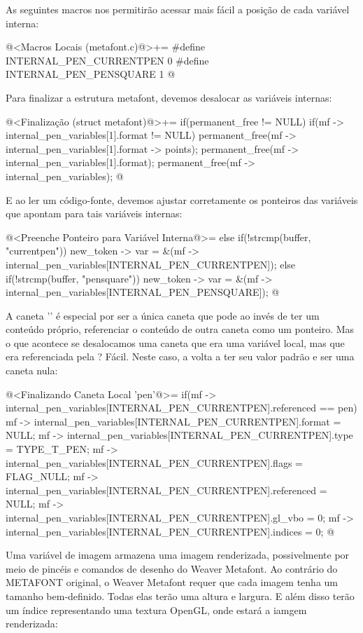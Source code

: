 As seguintes macros nos permitirão acessar mais fácil a posição de
cada variável interna:

\iniciocodigo
@<Macros Locais (metafont.c)@>+=
#define INTERNAL_PEN_CURRENTPEN 0
#define INTERNAL_PEN_PENSQUARE  1
@
\fimcodigo

Para finalizar a estrutura metafont, devemos desalocar as variáveis
internas:

\iniciocodigo
@<Finalização (struct metafont)@>+=
if(permanent_free != NULL){
  if(mf -> internal_pen_variables[1].format != NULL){
    permanent_free(mf -> internal_pen_variables[1].format -> points);
    permanent_free(mf -> internal_pen_variables[1].format);
  }
  permanent_free(mf -> internal_pen_variables);
}
@
\fimcodigo

E ao ler um código-fonte, devemos ajustar corretamente os ponteiros
das variáveis que apontam para tais variáveis internas:

\iniciocodigo
@<Preenche Ponteiro para Variável Interna@>=
else if(!strcmp(buffer, "currentpen"))
  new_token -> var =
          &(mf -> internal_pen_variables[INTERNAL_PEN_CURRENTPEN]);
else if(!strcmp(buffer, "pensquare"))
  new_token -> var =
          &(mf -> internal_pen_variables[INTERNAL_PEN_PENSQUARE]);
@
\fimcodigo

A caneta '' é especial por ser a única caneta
que pode ao invés de ter um conteúdo próprio, referenciar o conteúdo
de outra caneta como um ponteiro. Mas o que acontece se desalocamos
uma caneta que era uma variável local, mas que era referenciada
pela ? Fácil. Neste caso,
a  volta a ter seu valor padrão e ser uma
caneta nula:

\iniciocodigo
@<Finalizando Caneta Local 'pen'@>=
if(mf -> internal_pen_variables[INTERNAL_PEN_CURRENTPEN].referenced == pen){
  mf -> internal_pen_variables[INTERNAL_PEN_CURRENTPEN].format = NULL;
  mf -> internal_pen_variables[INTERNAL_PEN_CURRENTPEN].type = TYPE_T_PEN;
  mf -> internal_pen_variables[INTERNAL_PEN_CURRENTPEN].flags = FLAG_NULL;
  mf -> internal_pen_variables[INTERNAL_PEN_CURRENTPEN].referenced = NULL;
  mf -> internal_pen_variables[INTERNAL_PEN_CURRENTPEN].gl_vbo = 0;
  mf -> internal_pen_variables[INTERNAL_PEN_CURRENTPEN].indices = 0;
}
@
\fimcodigo


Uma variável de imagem armazena uma imagem renderizada, possivelmente
por meio de pincéis e comandos de desenho do Weaver Metafont. Ao
contrário do METAFONT original, o Weaver Metafont requer que cada
imagem tenha um tamanho bem-definido. Todas elas terão uma altura e
largura. E além disso terão um índice representando uma textura
OpenGL, onde estará a iamgem renderizada:

